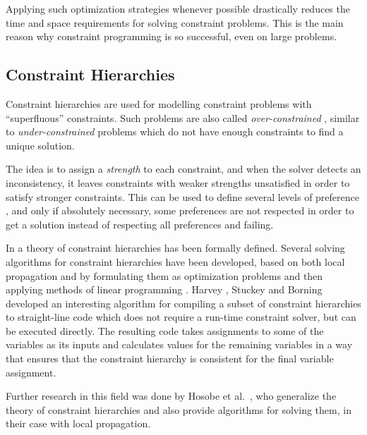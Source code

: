 Applying such optimization strategies whenever possible drastically
reduces the time and space requirements for solving constraint
problems.  This is the main reason why constraint programming is so
successful, even on large problems.

\subsection{Constraint Hierarchies}
\label{sec:constraint-hierarchies}

Constraint hierarchies%
%
%
 are used for modelling constraint
problems with ``superfluous'' constraints.  Such problems are also
called {\em over-constrained}%
, similar to {\em under-constrained}%
 problems which do not have enough
constraints to find a unique solution.

The idea is to assign a {\em strength}%
%
%
 to each constraint, and when the solver
detects an inconsistency, it leaves constraints with weaker strengths
unsatisfied in order to satisfy stronger constraints.  This can be
used to define several levels of preference%
, and only if absolutely necessary, some preferences
are not respected in order to get a solution instead of respecting all
preferences and failing.

In \cite{borning92constrainthierarchies} a theory of constraint
hierarchies has been formally defined.  Several solving algorithms for
constraint hierarchies have been developed, based on both local
propagation \cite{sannella92skyblue, borning98ultraviolet,
  borning95oti} and by formulating them as optimization problems and
then applying methods of linear programming%
 \cite{badros02cassowary}.  Harvey%
, Stuckey%
and Borning%
~\cite{harveyCompiling} developed an interesting
algorithm for compiling a subset of constraint hierarchies to
straight-line code which does not require a run-time constraint
solver, but can be executed directly.  The resulting code takes
assignments to some of the variables as its inputs and calculates
values for the remaining variables in a way that ensures that the
constraint hierarchy is consistent for the final variable assignment.

Further research in this field was done by Hosobe%
 et al.~\cite{hosobe94locally, hosobe96generalized}, who
generalize the theory of constraint hierarchies and also provide
algorithms for solving them, in their case with local propagation.

